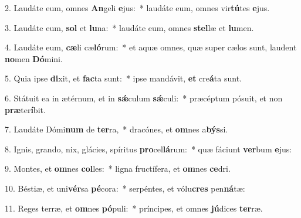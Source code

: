 
2. Laudáte eum, omnes \textbf{An}geli \textbf{e}jus:~* laudáte eum, omnes vir\textbf{tú}tes \textbf{e}jus.

3. Laudáte eum, \textbf{sol} et \textbf{lu}na:~* laudáte eum, omnes \textbf{stel}læ et \textbf{lu}men.

4. Laudáte eum, \textbf{cæ}li cæ\textbf{ló}rum:~* et aquæ omnes, quæ super cælos sunt, laudent \textbf{no}men \textbf{Dó}mini.

5. Quia ipse \textbf{di}xit, et \textbf{fac}ta sunt:~* ipse mandávit, \textbf{et} cre\textbf{á}ta sunt.

6. Státuit ea in ætérnum, et in \textbf{s\'{\ae}}culum \textbf{s\'{\ae}}culi:~* præcéptum pósuit, et non \textbf{præ}ter\textbf{í}bit.

7. Laudáte Dómi\textbf{num} de \textbf{ter}ra,~* dracónes, et \textbf{om}nes a\textbf{býs}si.

8. Ignis, grando, nix, glácies, spíritus \textbf{pro}cel\textbf{lá}rum:~* quæ fáciunt \textbf{ver}bum \textbf{e}jus:

9. Montes, et \textbf{om}nes \textbf{col}les:~* ligna fructífera, et \textbf{om}nes \textbf{ce}dri.

10. Béstiæ, et uni\textbf{vér}sa \textbf{pé}cora:~* serpéntes, et vólu\textbf{cres} pen\textbf{ná}tæ:

11. Reges terræ, et \textbf{om}nes \textbf{pó}puli:~* príncipes, et omnes \textbf{jú}dices \textbf{ter}ræ.

